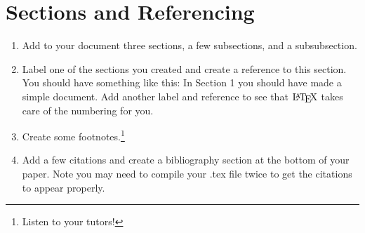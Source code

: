 \documentclass[12pt, a4paper]{article}
\begin{document}
    \section{Sections and Referencing}
    \begin{enumerate}
        \item Add to your document three sections, a few subsections, and a subsubsection.
        \item  Label one of the sections you created and create a reference to this section. You should have something like this: In Section 1 you should have made a simple document. Add another label and reference to see that $\textrm{\LaTeX }$ takes care of the numbering for you.
        \item  Create some footnotes.\footnote{Listen to your tutors!}
        \item Add a few citations and create a bibliography section at the bottom of your paper\cite{reference}. Note you may need to compile your .tex ﬁle twice to get the citations to appear properly.
  
    \end{enumerate}
     
\end{document}
